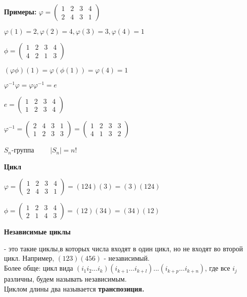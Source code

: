 \documentclass[12pt]{article}
\begin{document}
		
		\textbf{Примеры:} $\varphi=\begin{pmatrix}
		1 & 2 & 3 & 4 \\
		2 & 4 & 3 & 1
		\end{pmatrix}$
		
		$ \varphi(1)=2 , \varphi(2)=4, \varphi(3)=3, \varphi(4)=1$
		
		$\phi=\begin{pmatrix}
		1 & 2 & 3 & 4 \\
		4 & 2 & 1 & 3
		\end{pmatrix}$
		
		$(\varphi\phi)(1)=\varphi(\phi(1))=\varphi(4)=1$
		
		$\varphi^{-1}\varphi=\varphi\varphi^{-1}=e$
		
		$e=\begin{pmatrix}
		1 & 2 & 3 & 4 \\
		1 & 2 & 3 & 4
		\end{pmatrix}$
		
		$\varphi^{-1}=\begin{pmatrix}
		2 & 4 & 3 & 1 \\
		1 & 2 & 3 & 3
		\end{pmatrix}=\begin{pmatrix}
		1 & 2 & 3 & 3 \\
		4 & 1 & 3 & 2 
		\end{pmatrix}$
		
		$S_n$-группа  $\qquad |S_n|=n!$
		
		\textbf{Цикл}
		
		$\varphi=\begin{pmatrix}
		1 & 2 & 3 & 4 \\
		2 & 4 & 3 & 1
		\end{pmatrix}=(124)(3)=(3)(124)$
		
		$\phi=\begin{pmatrix}
		1 & 2 & 3 & 4 \\
		2 & 1 & 4 & 3
		\end{pmatrix}=(12)(34)=(34)(12)$
		
		\hypertarget{def:while}{\textbf{Независимые циклы}} - это такие циклы,в которых числа входят в один цикл, но не входят во второй цикл. Например, $(123)(456)$ - независимый.\\
		Более обще: цикл вида $(i_1 i_2 ... i_k)(i_{k+1} ... i_{k+l})...(i_{k+p} ... i_{k + n})$, где все $i_j$ различны, будем называть независимым.\\
		Циклом длины два называется \textbf{транспозиция.}
		
\end{document}
